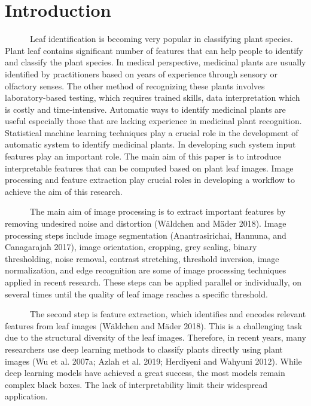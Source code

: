 \documentclass{article}
\begin{document}

\hypertarget{introduction}{%
\section{Introduction}\label{introduction}}

~~~~~~Leaf identification is becoming very popular in classifying plant
species. Plant leaf contains significant number of features that can
help people to identify and classify the plant species. In medical
perspective, medicinal plants are usually identified by practitioners
based on years of experience through sensory or olfactory senses. The
other method of recognizing these plants involves laboratory-based
testing, which requires trained skills, data interpretation which is
costly and time-intensive. Automatic ways to identify medicinal plants
are useful especially those that are lacking experience in medicinal
plant recognition. Statistical machine learning techniques play a
crucial role in the development of automatic system to identify
medicinal plants. In developing such system input features play an
important role. The main aim of this paper is to introduce interpretable
features that can be computed based on plant leaf images. Image
processing and feature extraction play crucial roles in developing a
workflow to achieve the aim of this research.

~~~~~~The main aim of image processing is to extract important features
by removing undesired noise and distortion (Wäldchen and Mäder 2018).
Image processing steps include image segmentation (Anantrasirichai,
Hannuna, and Canagarajah 2017), image orientation, cropping, grey
scaling, binary thresholding, noise removal, contrast stretching,
threshold inversion, image normalization, and edge recognition are some
of image processing techniques applied in recent research. These steps
can be applied parallel or individually, on several times until the
quality of leaf image reaches a specific threshold.

~~~~~~The second step is feature extraction, which identifies and
encodes relevant features from leaf images (Wäldchen and Mäder 2018).
This is a challenging task due to the structural diversity of the leaf
images. Therefore, in recent years, many researchers use deep learning
methods to classify plants directly using plant images (Wu et al. 2007a;
Azlah et al. 2019; Herdiyeni and Wahyuni 2012). While deep learning
models have achieved a great success, the most models remain complex
black boxes. The lack of interpretability limit their widespread
application.
\end{document}
